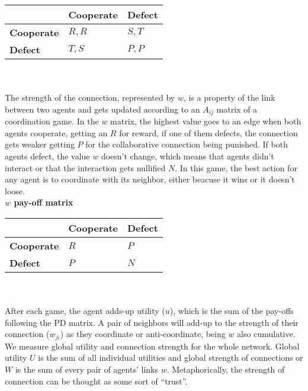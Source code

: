 \documentclass[11pt]{article}
\begin{document}
\begin{tabular}{| l | l | l |}
\hline
          & \bf{Cooperate} & \bf{Defect} \\ \hline
\bf{Cooperate} &  $R,R$      &  $S,T$   \\ \hline
\bf{Defect}    &  $T,S$      &  $P,P$   \\ \hline

\end{tabular}\\ \\

The strength of the connection, represented by $w$, is a property of the link between two agents and
gets updated according to an $A_{ij}$ matrix of a coordination game. In the $w$ matrix, the highest value
goes to an edge when both agents cooperate, getting an $R$ for reward, if one of
them defects, the connection gets weaker getting $P$ for the collaborative
connection being punished. If both agents defect, the value $w$ doesn't change,
which means that agents didn't interact or that the interaction gets nullified
$N$. In this game, the best action for any agent is to coordinate with its
neighbor, either beacuse it wins or it doesn't loose. \\ 

{\bf $w$ pay-off matrix}\\

\begin{tabular}{| l | l | l |}
\hline
          & \bf{Cooperate} & \bf{Defect} \\ \hline
\bf{Cooperate} &  $R$      &  $P$   \\ \hline
\bf{Defect}    &  $P$      &  $N$   \\ \hline

\end{tabular}\\ \\


After each game, the agent adds-up utility ($u$), which is the sum of the
pay-offs following the PD matrix. A pair of neighbors will add-up to the strength of
their connection ($w_{ji}$) as they coordinate or anti-coordinate, being $w$
also cumulative. We measure global utility and connection strength for the whole
network. Global utility $U$ is the sum of all individual utilities and global
strength of connections or $W$ is the sum of every pair of agents' links
$w$. Metaphorically, the strength of connection can 
be thought as some sort of ``trust''.\\
\end{document}
